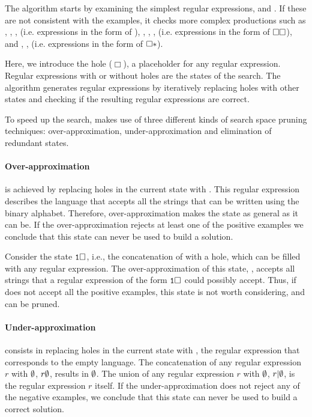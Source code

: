 The algorithm starts by examining the simplest regular expressions,  and .
If these are not consistent with the examples, it checks more complex productions such as , , ,  (i.e. expressions in the form of \regex{\Box|\Box}), , , ,  (i.e. expressions in the form of \(\tt\Box\Box\)), and , , (i.e. expressions in the form of \(\tt\Box*\)).

Here, we introduce the hole (\(\Box\)), a placeholder for any regular expression. Regular expressions with or without holes are the states of the search.
The algorithm generates regular expressions by iteratively replacing holes with other states and checking if the resulting regular expressions are correct.

To speed up the search, \AlphaRegex makes use of three different kinds of search space pruning techniques: over-approximation, under-approximation and elimination of redundant states.

\paragraph{Over-approximation} is achieved by replacing holes in the current state with .
This regular expression describes the language that accepts all the strings that can be written using the binary alphabet.
Therefore, over-approximation makes the state as general as it can be.
If the over-approximation rejects at least one of the positive examples we conclude that this state can never be used to build a solution.

\begin{example}
Consider the state \(\tt1\Box\), i.e., the concatenation of  with a hole, which can be filled with any regular expression. The over-approximation of this state, , accepts all strings that a regular expression of the form \(\tt1\Box\) could possibly accept. Thus, if  does not accept all the positive examples, this state is not worth considering, and can be pruned.
\end{example}

\paragraph{Under-approximation} consists in replacing holes in the current state with \regex{\emptyset}, the regular expression that corresponds to the empty language. The concatenation of any regular expression \(r\) with \(\tt\emptyset\), \(r\tt\emptyset\), results in \(\tt\emptyset\). The union of any  regular expression \(r\) with \(\tt\emptyset\), \(r|\tt\emptyset\), is the regular expression \(r\) itself.
If the under-approximation does not reject any of the negative examples,  we conclude that this state can never be used to build a correct solution.

